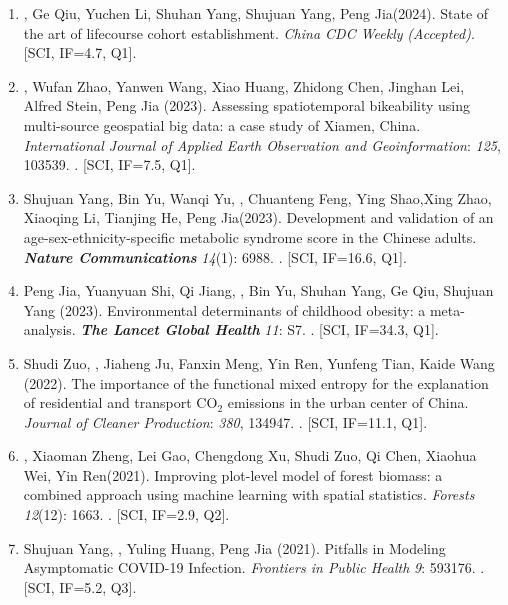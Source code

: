 \begin{enumerate}
\item
    \Shaoqing, Ge Qiu, Yuchen Li, Shuhan Yang, Shujuan Yang, Peng Jia\CS (2024).
    State of the art of lifecourse cohort establishment. 
    \textit{China CDC Weekly} \textit{(Accepted)}. [SCI, IF=4.7, Q1].
\item
    \Shaoqing, Wufan Zhao, Yanwen Wang, Xiao Huang, Zhidong Chen, Jinghan Lei, Alfred Stein, Peng Jia (2023).
    Assessing spatiotemporal bikeability using multi-source geospatial big data: a case study of Xiamen, China. 
    \textit{International Journal of Applied Earth Observation and Geoinformation}: \textit{125}, 103539.
    . [SCI, IF=7.5, Q1].
\item
    Shujuan Yang, Bin Yu, Wanqi Yu, \Shaoqing, Chuanteng Feng, Ying Shao,Xing Zhao, Xiaoqing Li, Tianjing He, Peng Jia\CS (2023).
    Development and validation of an age-sex-ethnicity-specific metabolic syndrome score in the Chinese adults.
    \textbf{\textit{Nature Communications}} \textit{14}(1): 6988.
    . [SCI, IF=16.6, Q1].
\item
    Peng Jia\CS, Yuanyuan Shi, Qi Jiang, \Shaoqing, Bin Yu, Shuhan Yang, Ge Qiu, Shujuan Yang (2023).
    Environmental determinants of childhood obesity: a meta-analysis.
    \textbf{\textit{The Lancet Global Health}} \textit{11}: S7.
    . [SCI, IF=34.3, Q1].
\item
    Shudi Zuo, \Shaoqing, Jiaheng Ju, Fanxin Meng, Yin Ren, Yunfeng Tian, Kaide Wang (2022).
    The importance of the functional mixed entropy for the explanation of residential and transport CO$_2$ emissions in the urban center of China.
    \textit{Journal of Cleaner Production}: \textit{380}, 134947.
    . [SCI, IF=11.1, Q1].
\item
    \Shaoqing\CF, Xiaoman Zheng\CF, Lei Gao, Chengdong Xu, Shudi Zuo, Qi Chen, Xiaohua Wei, Yin Ren\CS (2021).
    Improving plot-level model of forest biomass: a combined approach using machine learning with spatial statistics.
    \textit{Forests} \textit{12}(12): 1663.
    . [SCI, IF=2.9, Q2].
\item
    Shujuan Yang, \Shaoqing, Yuling Huang, Peng Jia (2021).
    Pitfalls in Modeling Asymptomatic COVID-19 Infection.
    \textit{Frontiers in Public Health} \textit{9}: 593176.
    . [SCI, IF=5.2, Q3].

\end{enumerate}
